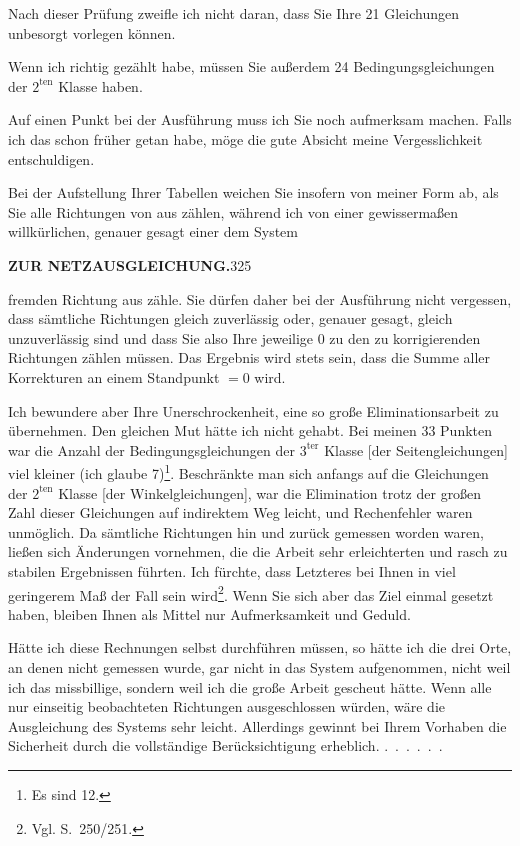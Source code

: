Nach dieser Prüfung zweifle ich nicht daran, dass Sie Ihre 21 Gleichungen
unbesorgt vorlegen können.

Wenn ich richtig gezählt habe, müssen Sie außerdem 24 Bedingungsgleichungen
der $2^{\mathrm{ten}}$ Klasse haben.

Auf einen Punkt bei der Ausführung muss ich Sie noch aufmerksam machen.
Falls ich das schon früher getan habe, möge die gute Absicht meine
Vergesslichkeit entschuldigen.

Bei der Aufstellung Ihrer Tabellen weichen Sie insofern von meiner Form ab,
als Sie alle Richtungen von  aus zählen, während ich
von einer gewissermaßen willkürlichen, genauer gesagt einer dem System\par
\clearpage
\noindent\textbf{ZUR NETZAUSGLEICHUNG.}\hfill325\par\medskip
\noindent fremden Richtung aus zähle. Sie dürfen daher bei der Ausführung
nicht vergessen, dass sämtliche Richtungen gleich zuverlässig oder,
genauer gesagt, gleich unzuverlässig sind und dass Sie also Ihre jeweilige
0 zu den zu korrigierenden Richtungen zählen müssen. Das Ergebnis wird
stets sein, dass die Summe aller Korrekturen an einem Standpunkt $=0$ wird.

\begingroup
\def\letterfivestars{*}
\makeatletter
\renewcommand{\@makefnmark}{\hbox{\normalfont[\textsuperscript{\letterfivestars})]}}
\renewcommand{\@makefntext}[1]{\parindent1em\noindent\hbox to2.4em{\hss[\textsuperscript{\letterfivestars})\ }#1]}
\makeatother
Ich bewundere aber Ihre Unerschrockenheit, eine so große Eliminationsarbeit
zu übernehmen. Den gleichen Mut hätte ich nicht gehabt. Bei meinen 33
Punkten war die Anzahl der Bedingungsgleichungen der $3^{\mathrm{ter}}$ Klasse
[der Seitengleichungen] viel kleiner (ich glaube 7)\footnote{Es sind 12.}.
Beschränkte man sich anfangs auf die Gleichungen der $2^{\mathrm{ten}}$ Klasse
[der Winkelgleichungen], war die Elimination trotz der großen Zahl dieser
Gleichungen auf indirektem Weg leicht, und Rechenfehler waren unmöglich. Da
sämtliche Richtungen hin und zurück gemessen worden waren, ließen sich
Änderungen vornehmen, die die Arbeit sehr erleichterten und rasch zu
stabilen Ergebnissen führten. Ich fürchte, dass Letzteres bei Ihnen in
viel geringerem Maß der Fall sein wird\def\letterfivestars{**}\footnote{Vgl. S.\ 250/251.}.
Wenn Sie sich aber das Ziel einmal gesetzt haben, bleiben Ihnen als Mittel
nur Aufmerksamkeit und Geduld.

Hätte ich diese Rechnungen selbst durchführen müssen, so hätte ich die drei
Orte, an denen nicht gemessen wurde, gar nicht in das System aufgenommen,
nicht weil ich das missbillige, sondern weil ich die große Arbeit gescheut
hätte. Wenn alle nur einseitig beobachteten Richtungen ausgeschlossen
würden, wäre die Ausgleichung des Systems sehr leicht. Allerdings gewinnt
bei Ihrem Vorhaben die Sicherheit durch die vollständige Berücksichtigung
erheblich. .\ .\ .\ .\ .\ .

